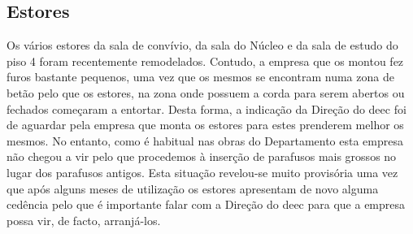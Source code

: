 
\subsection{Estores}

Os vários estores da sala de convívio, da sala do Núcleo e da sala de estudo do piso 4 foram recentemente remodelados. Contudo, a empresa que os montou fez furos bastante pequenos, uma vez que os mesmos se encontram numa zona de betão pelo que os estores, na zona onde possuem a corda para serem abertos ou fechados começaram a entortar. Desta forma, a indicação da Direção do \acrshort{deec} foi de aguardar pela empresa que monta os estores para estes prenderem melhor os mesmos. No entanto, como é habitual nas obras do Departamento esta empresa não chegou a vir pelo que procedemos à inserção de parafusos mais grossos no lugar dos parafusos antigos. Esta situação revelou-se muito provisória uma vez que após alguns meses de utilização os estores apresentam de novo alguma cedência pelo que é importante falar com a Direção do \acrshort{deec} para que a empresa possa vir, de facto, arranjá-los.